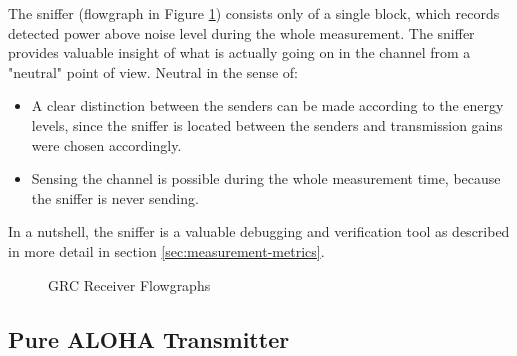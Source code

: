 The sniffer (flowgraph in Figure \ref{fig:grc-sniffer}) consists only of a single  block, which records detected power above noise level during the whole measurement. The sniffer provides valuable insight of what is actually going on in the channel from a "neutral" point of view. Neutral in the sense of:

\begin{itemize}
	\item A clear distinction between the senders can be made according to the energy levels, since the sniffer is located between the senders and transmission gains were chosen accordingly.
	\item Sensing the channel is possible during the whole measurement time, because the sniffer is never sending.
\end{itemize}

In a nutshell, the sniffer is a valuable debugging and verification tool as described in more detail in section \ref{sec:measurement-metrics}.

\begin{figure}
	\begin{center}
		\label{fig:grc-receiver}
		\vskip 40pt
		\label{fig:grc-sniffer}
	\end{center}
	\caption{GRC Receiver Flowgraphs}
\end{figure}

\subsection{Pure ALOHA Transmitter}
\label{sec:aloha-sender}

